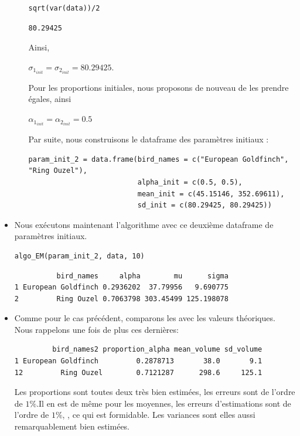 \documentclass[frenchb]{report}
\newcommand{\1}{\mathbbm{1}}
\theoremstyle{definition}\newtheorem{defn}{Définition}
\theoremstyle{definition}\newtheorem{exm}{Exemple}
\theoremstyle{definition}\newtheorem{nota}{Notation}
\theoremstyle{definition}\newtheorem{rem}{Remarque}
\begin{document}
\begin{itemize}[label=\adfflowerleft]
\begin{itemize}[label=\adfflowerleft]
\begin{lstlisting}
sqrt(var(data))/2
\end{lstlisting}

\begin{verbatim}
80.29425
\end{verbatim}
Ainsi, 
\begin{center}
$\sigma_{1_{init}} = \sigma_{2_{init}} = 80.29425$. \newline
\end{center}
Pour les proportions initiales, nous proposons de nouveau de les prendre égales, ainsi 
\begin{center}
$\alpha_{1_{init}} = \alpha_{2_{init}} = 0.5$
\end{center}
Par suite, nous construisons le dataframe des paramètres initiaux : 
\begin{lstlisting}
param_init_2 = data.frame(bird_names = c("European Goldfinch", "Ring Ouzel"),
                          alpha_init = c(0.5, 0.5),
                          mean_init = c(45.15146, 352.69611),
                          sd_init = c(80.29425, 80.29425))
\end{lstlisting}
\end{itemize}

\item Nous exécutons maintenant l'algorithme avec ce deuxième dataframe de paramètres initiaux.
\begin{lstlisting}
algo_EM(param_init_2, data, 10)
\end{lstlisting}

\begin{verbatim}
          bird_names     alpha        mu      sigma
1 European Goldfinch 0.2936202  37.79956   9.690775
2         Ring Ouzel 0.7063798 303.45499 125.198078
\end{verbatim}

\item Comme pour le cas précédent, comparons les avec les valeurs théoriques. Nous rappelons une fois de plus ces dernières:
\begin{verbatim}
         bird_names2 proportion_alpha mean_volume sd_volume
1 European Goldfinch         0.2878713       38.0       9.1
12         Ring Ouzel        0.7121287      298.6     125.1
\end{verbatim}

Les proportions sont toutes deux très bien estimées, les erreurs sont de l'ordre de $1\%$.Il en est de même pour les moyennes, les erreurs d'estimations sont de l'ordre de $1\%$, , ce qui est formidable. Les variances sont elles aussi remarquablement bien estimées.

\end{itemize}
\end{document}
